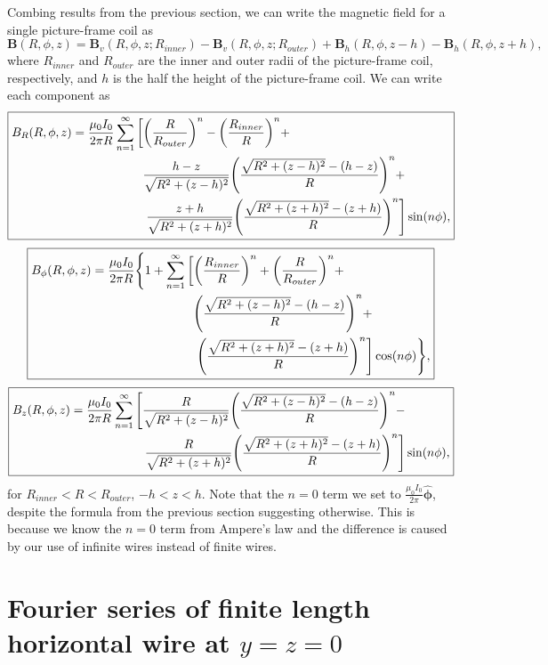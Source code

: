 \documentclass{article}
\let\vec\mathbf
\begin{document}
Combing results from the previous section, we can write the magnetic field
for a single picture-frame coil as
\[\vec{B}(R,\phi, z) = \vec{B}_{v}(R, \phi, z; R_{inner}) - \vec{B}_{v}(R, \phi, z; R_{outer}) + \vec{B}_{h}(R, \phi, z-h) - \vec{B}_{h}(R, \phi, z+h),\]
where $R_{inner}$ and $R_{outer}$ are the inner and outer radii of the picture-frame coil, respectively,
and $h$ is the half the height of the picture-frame coil. We can write each component as
\[\boxed{
\begin{aligned}
B_R(R,\phi,z) = \frac{\mu_0 I_0}{2 \pi R}\sum_{n=1}^{\infty}&\left[\qty(\frac{R}{R_{outer}})^n-\qty(\frac{R_{inner}}{R})^n+\right. \\
&\ \ \frac{h-z}{\sqrt{R^2+(z-h)^2}}\qty(\frac{\sqrt{R^2+(z-h)^2}-(h-z)}{R})^n+ \\
&\ \ \left.\frac{z+h}{\sqrt{R^2+(z+h)^2}}\qty(\frac{\sqrt{R^2+(z+h)^2}-(z+h)}{R})^n\right]\sin(n\phi),
\end{aligned}
}\]
\[\boxed{
\begin{aligned}
B_\phi(R,\phi,z) = \frac{\mu_0 I_0}{2 \pi R}\Bigg\{1+\sum_{n=1}^{\infty}&\left[\qty(\frac{R_{inner}}{R})^n+ \qty(\frac{R}{R_{outer}})^n+\right. \\
&\ \ \qty(\frac{\sqrt{R^2+(z-h)^2}-(h-z)}{R})^n+ \\
&\ \ \left.\qty(\frac{\sqrt{R^2+(z+h)^2}-(z+h)}{R})^n\right]\cos(n\phi)\Bigg\},
\end{aligned}
}\]
\[\boxed{
\begin{aligned}
B_z(R,\phi,z) = \frac{\mu_0 I_0}{2 \pi R}\sum_{n=1}^{\infty}&\left[\frac{R}{\sqrt{R^2+(z-h)^2}}\qty(\frac{\sqrt{R^2+(z-h)^2}-(h-z)}{R})^n-\right. \\
&\ \ \left.\frac{R}{\sqrt{R^2+(z+h)^2}}\qty(\frac{\sqrt{R^2+(z+h)^2}-(z+h)}{R})^n\right]\sin(n\phi),
\end{aligned}
}\]
for $R_{inner}<R<R_{outer}$, $-h<z<h$.
Note that the $n=0$ term we set to $\frac{\mu_0 I_0}{2 \pi}\vec{\hat{\phi}}$,
despite the formula from the previous section suggesting otherwise.
This is because we know the $n=0$ term from Ampere's law and the difference
is caused by our use of infinite wires instead of finite wires.

\section{\texorpdfstring{Fourier series of finite length horizontal wire at $y=z=0$}{Fourier series of finite length horizontal wire at y=z=0}}
\end{document}
